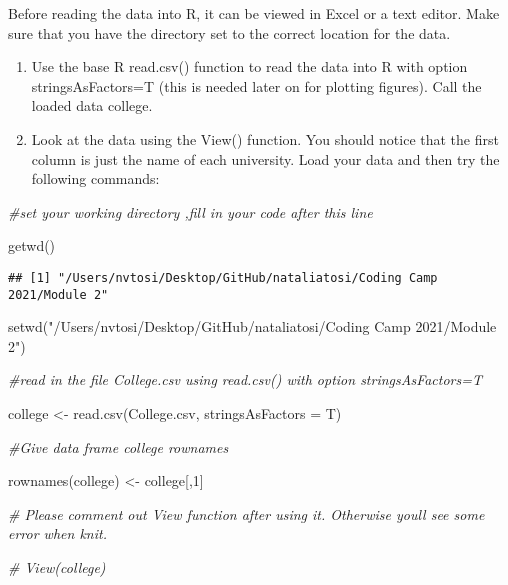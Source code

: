 \documentclass[
]{article}
\newenvironment{Shaded}{\begin{snugshade}}{\end{snugshade}}
\newcommand{\AttributeTok}[1]{\textcolor[rgb]{0.77,0.63,0.00}{#1}}
\newcommand{\CommentTok}[1]{\textcolor[rgb]{0.56,0.35,0.01}{\textit{#1}}}
\newcommand{\DecValTok}[1]{\textcolor[rgb]{0.00,0.00,0.81}{#1}}
\newcommand{\FunctionTok}[1]{\textcolor[rgb]{0.00,0.00,0.00}{#1}}
\newcommand{\NormalTok}[1]{#1}
\newcommand{\OtherTok}[1]{\textcolor[rgb]{0.56,0.35,0.01}{#1}}
\newcommand{\StringTok}[1]{\textcolor[rgb]{0.31,0.60,0.02}{#1}}
\begin{document}
Before reading the data into R, it can be viewed in Excel or a text
editor. Make sure that you have the directory set to the correct
location for the data.

\begin{enumerate}
\def\labelenumi{\alph{enumi}.}
\item
  Use the base R read.csv() function to read the data into R with option
  stringsAsFactors=T (this is needed later on for plotting figures).
  Call the loaded data college.
\item
  Look at the data using the View() function. You should notice that the
  first column is just the name of each university. Load your data and
  then try the following commands:
\end{enumerate}

\begin{Shaded}
\begin{Highlighting}[]
\CommentTok{\#set your working directory ,fill in your code after this line}

\FunctionTok{getwd}\NormalTok{()}
\end{Highlighting}
\end{Shaded}

\begin{verbatim}
## [1] "/Users/nvtosi/Desktop/GitHub/nataliatosi/Coding Camp 2021/Module 2"
\end{verbatim}

\begin{Shaded}
\begin{Highlighting}[]
\FunctionTok{setwd}\NormalTok{(}\StringTok{"/Users/nvtosi/Desktop/GitHub/nataliatosi/Coding Camp 2021/Module 2"}\NormalTok{)}

\CommentTok{\#read in the file College.csv using read.csv() with option \textasciigrave{}stringsAsFactors=T\textasciigrave{}}

\NormalTok{college }\OtherTok{\textless{}{-}} \FunctionTok{read.csv}\NormalTok{(}\StringTok{\textquotesingle{}College.csv\textquotesingle{}}\NormalTok{, }\AttributeTok{stringsAsFactors =}\NormalTok{ T)}

\CommentTok{\#Give data frame college rownames}

\FunctionTok{rownames}\NormalTok{(college) }\OtherTok{\textless{}{-}}\NormalTok{ college[,}\DecValTok{1}\NormalTok{] }

\CommentTok{\# Please comment out View function after using it. Otherwise you\textquotesingle{}ll see some error when knit.}

\CommentTok{\# View(college)}
\end{Highlighting}
\end{Shaded}
\end{document}
